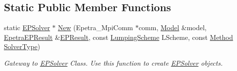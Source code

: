 \subsection*{Static Public Member Functions}
\begin{DoxyCompactItemize}
\item 
static \hyperlink{classvoom_1_1_e_p_solver}{EPSolver} $\ast$ \hyperlink{classvoom_1_1_e_p_solver_a29e58f5a19d262fb808351f772547bef}{New} (Epetra\_\-MpiComm $\ast$comm, \hyperlink{classvoom_1_1_model}{Model} \&model, \hyperlink{structvoom_1_1_epetra_e_p_result}{EpetraEPResult} \&\hyperlink{structvoom_1_1_e_p_result}{EPResult}, const \hyperlink{namespacevoom_aad2b72d6024982ad6a82eccb9698964e}{LumpingScheme} LScheme, const \hyperlink{namespacevoom_aa7998516d4918c6d10beb11401158a43}{Method} \hyperlink{namespacevoom_a2874640a1124292b983171d745088fef}{SolverType})
\begin{DoxyCompactList}\small\item\em Gateway to \hyperlink{classvoom_1_1_e_p_solver}{EPSolver} Class. Use this function to create \hyperlink{classvoom_1_1_e_p_solver}{EPSolver} objects. \item\end{DoxyCompactList}\end{DoxyCompactItemize}
